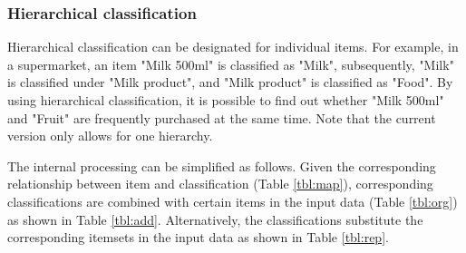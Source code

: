 \subsubsection*{Hierarchical classification}
Hierarchical classification can be designated for individual items. 
For example, in a supermarket, an item "Milk 500ml" is classified as "Milk", subsequently, "Milk" is classified under "Milk product", and "Milk product" is classified as "Food".
By using hierarchical classification, it is possible to find out whether "Milk 500ml" and "Fruit" are frequently purchased at the same time.
Note that the current version only allows for one hierarchy.

The internal processing can be simplified as follows. Given the corresponding relationship between item and classification (Table \ref{tbl:map}), corresponding classifications are combined with certain items in the input data (Table \ref{tbl:org}) as shown in Table \ref{tbl:add}.  Alternatively, the classifications substitute the corresponding itemsets in the input data as shown in Table \ref{tbl:rep}.  

